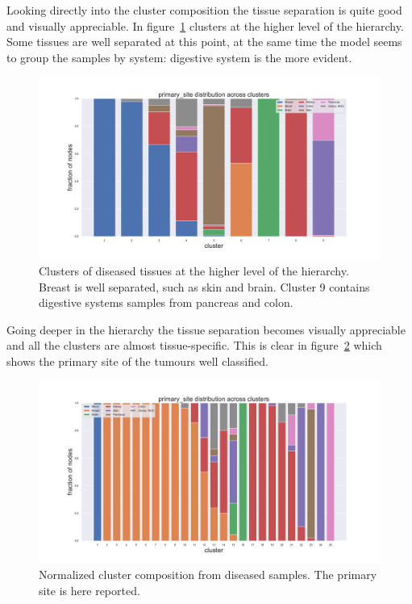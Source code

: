 \FloatBarrier
Looking directly into the cluster composition the tissue separation is quite good and visually appreciable. In figure~\ref{fig:topic/tcga/fraction_clustercomposition_l4_primary_site} clusters at the higher level of the hierarchy. Some tissues are well separated at this point, at the same time the model seems to group the samples by system: digestive system is the more evident.
\begin{figure}[htb!]
	\centering
	\includegraphics[width=0.9\linewidth]{pictures/topic/tcga/fraction_clustercomposition_l4_primary_site.pdf}
	\caption{Clusters of diseased tissues at the higher level of the hierarchy. Breast is well separated, such as skin and brain. Cluster 9 contains digestive systems samples from pancreas and colon.}
	\label{fig:topic/tcga/fraction_clustercomposition_l4_primary_site}
\end{figure}
Going deeper in the hierarchy the tissue separation becomes visually appreciable and all the clusters are almost tissue-specific. This is clear in figure~\ref{fig:topic/tcga/fraction_clustercomposition_l3_primary_site} which shows the primary site of the tumours well classified.
\begin{figure}[htb!]
	\centering
	\includegraphics[width=0.9\linewidth]{pictures/topic/tcga/fraction_clustercomposition_l3_primary_site.pdf}
	\caption{Normalized cluster composition from diseased samples. The primary site is here reported.}
	\label{fig:topic/tcga/fraction_clustercomposition_l3_primary_site}
\end{figure}

